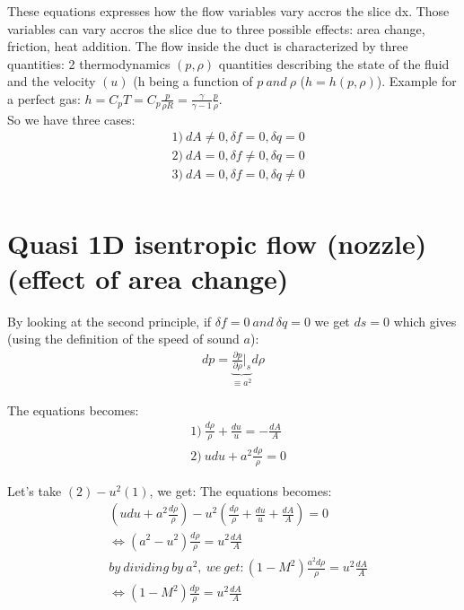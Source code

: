 These equations expresses how the flow variables vary accros the slice dx. Those variables can vary accros the slice due to three possible effects: area change, friction, heat addition.
The flow inside the duct is characterized by three quantities: 2 thermodynamics $(p,\rho)$ quantities describing the state of the fluid and the velocity $(u)$ (h being a function of $p\ and\ \rho$ ($h=h(p,\rho)$). Example for a perfect gas: $h=C_pT=C_p\frac{p}{\rho R}=\frac{\gamma}{\gamma-1}\frac{p}{\rho}$.
\\

So we have three cases:
 \begin{equation}
\begin{aligned}
&1)\ dA \neq 0, \delta f=0, \delta q=0 \\
&2)\ dA=0, \delta f\neq0, \delta q=0 \\
&3)\ dA=0, \delta f=0, \delta q\neq0 \\
\end{aligned} 
\end{equation}

\section{Quasi 1D isentropic flow (nozzle) (effect of area change)}

By looking at the second principle, if $\delta f=0\ and\ \delta q=0$ we get $ds=0$ which gives (using the definition of the speed of sound $a$):
 \begin{equation}
\begin{aligned}
dp=\underbrace{\frac{\partial p}{\partial \rho}|_s}_{\equiv a^2}d\rho
\end{aligned} 
\end{equation}

The equations becomes:
 \begin{equation}
\begin{aligned}
&1)\ \frac{d\rho}{\rho}+\frac{du}{u}=-\frac{dA}{A} \\
&2)\ udu+a^2\frac{d\rho}{\rho}=0
\end{aligned} 
\end{equation}

Let's take $(2)-u^2(1)$, we get:
The equations becomes:
 \begin{equation}
\begin{aligned}
&(udu+a^2\frac{d\rho}{\rho})-u^2(\frac{d\rho}{\rho}+\frac{du}{u}+\frac{dA}{A})=0 \\
& \Leftrightarrow (a^2-u^2)\frac{d\rho}{\rho}=u^2\frac{dA}{A} \\
&by\ dividing\ by\ a^2,\ we\ get: (1-M^2)\frac{a^2d\rho}{\rho}=u^2\frac{dA}{A} \\
& \Leftrightarrow (1-M^2)\frac{dp}{\rho}=u^2\frac{dA}{A}
\end{aligned} 
\end{equation}

